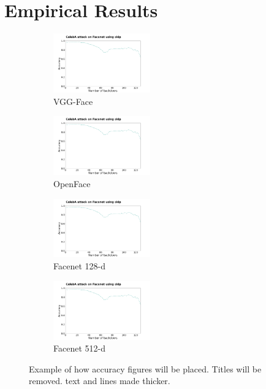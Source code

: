 \documentclass{article}
\theoremstyle{plain}
\theoremstyle{definition}
\theoremstyle{remark}
\begin{document}
\section{Empirical Results}
\label{Empirical Results}
    \begin{figure}[t!]
    \centering
    \begin{subfigure}[t]{0.23\textwidth}
        \centering
        \includegraphics[height=1.0in]{figures/facenet_pca_attack.png}
        \caption{VGG-Face}
    \end{subfigure}%
    \hfill 
    \begin{subfigure}[t]{0.23\textwidth}
        \centering
        \includegraphics[height=1.0in]{figures/facenet_pca_attack.png}
        \caption{OpenFace}
    \end{subfigure}
    \hfill 
    \begin{subfigure}[t]{0.23\textwidth}
        \centering
        \includegraphics[height=1.0in]{figures/facenet_pca_attack.png}
        \caption{Facenet 128-d}
    \end{subfigure}
    \hfill 
    \begin{subfigure}[t]{0.23\linewidth}
        \centering
        \includegraphics[height=1.0in]{figures/facenet_pca_attack.png}
        \caption{Facenet 512-d}
    \end{subfigure}
    \caption{Example of how accuracy figures will be placed. Titles will be removed. text and lines made thicker.}
\end{figure}
\end{document}

